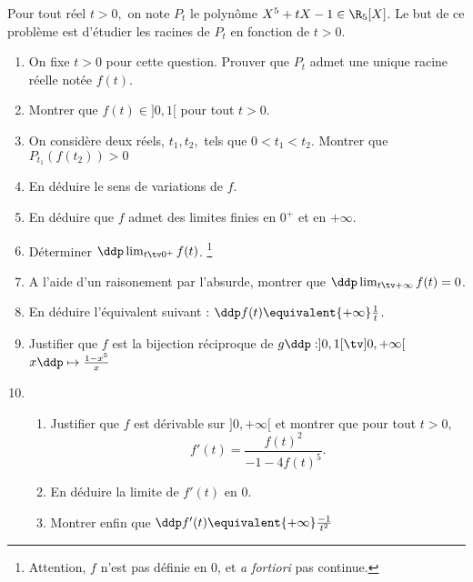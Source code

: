 \documentclass[a4paper, 11pt,reqno]{article}
\begin{document}
\vspace{1cm}
\begin{exercice}
Pour tout réel $t>0, $ on note $P_t$ le polynôme $X^5 +tX-1 \in \R_5[X]$. Le but de ce problème est d'étudier les racines de $P_t$ en fonction de $t>0$. 
\begin{enumerate}
\item On fixe $t>0$ pour cette question. Prouver que $P_t$ admet une unique racine réelle notée $f(t)$. 
\item Montrer que $f(t) \in ]0,1[$ pour tout $t>0.$
\item On considère deux réels, $t_1,t_2,$ tels que $0<t_1<t_2$. Montrer que $P_{t_1}(f(t_2))>0$
\item En déduire le sens de variations de $f$.
\item En déduire que $f$ admet des limites finies en $0^+$ et en $+\infty$.

\item Déterminer $\ddp \lim_{t\tv 0^+} f(t)$. \footnote{Attention, $f$ n'est pas définie en $0$, et \emph{a fortiori} pas continue.}

\item A l'aide d'un raisonement par l'absurde, montrer que $\ddp \lim_{t\tv+\infty} f(t)=0$. 
\item En déduire  l'équivalent suivant : $\ddp f(t)\equivalent{+\infty} \frac{1}{t}$. 

\item Justifier que $f$ est la bijection réciproque de $g \ddp  : ]0,1[\tv ]0,+\infty[$ 
$x\ddp  \mapsto\frac{1-x^5}{x}$
\item \begin{enumerate}
\item Justifier que $f$ est dérivable sur $]0,+\infty[ $ et montrer que  pour tout $t>0,$ 
$$f'(t)= \frac{f(t)^2}{ -1-4f(t)^5}.$$
\item En déduire la limite de $f'(t)$ en $0$. 
\item Montrer enfin que $ \ddp f'(t) \equivalent{+\infty} \frac{-1}{t^2} $
\end{enumerate}
\end{enumerate}
\end{exercice}
\end{document}

